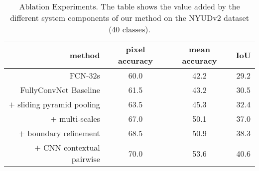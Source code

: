 \begin{table}[t]
\caption{Ablation Experiments. The table shows the value added
by the different system components of our method on the NYUDv2 dataset (40 classes).
}
\centering
\resizebox{1\linewidth}{!}
  {
  \begin{tabular}{ r | c c c }
method  &pixel accuracy &mean accuracy  &IoU\\ \hline \hline
FCN-32s \cite{LongSD14} &60.0 &42.2 &29.2\\ \hline
FullyConvNet Baseline  &61.5 &43.2 &30.5\\
$+$ sliding pyramid pooling  &63.5 &45.3 &32.4\\
$+$ multi-scales  &67.0 &50.1 &37.0\\
$+$ boundary refinement &68.5 &50.9 &38.3\\
$+$ CNN contextual pairwise &70.0 &53.6 &40.6\\
 \end{tabular}
  }
\label{tab:featmapnet}
\end{table}









